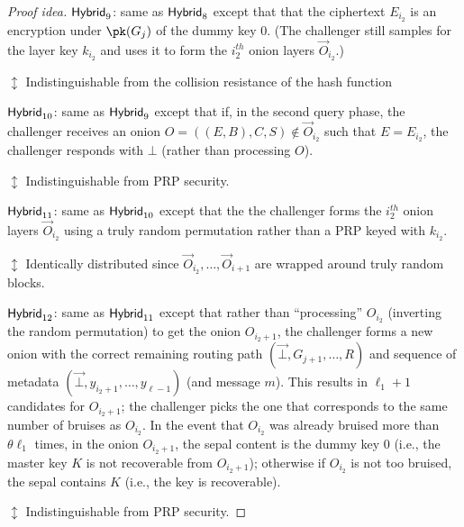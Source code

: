 \documentclass[runningheads,a4paper]{llncs}
\begin{document}
\begin{proof}[Proof idea]
\noindent $\mathsf{Hybrid}_{9}$: same as $\mathsf{Hybrid}_{8}$ except that that the ciphertext $E_{i_2}$ is an encryption under $\pk(G_{j})$ of the dummy key $0$. (The challenger still samples for the layer key $k_{i_2}$ and uses it to form the $i_2^\mathit{th}$ onion layers $\vec{O}_{i_2}$.)

    \textcolor{hybrid}{$\updownarrow$ Indistinguishable from the collision resistance of the hash function}

\noindent $\mathsf{Hybrid}_{10}$: same as $\mathsf{Hybrid}_{9}$ except that if, in the second query phase, the challenger receives an onion $O = ((E, B), C, S) \not\in \vec{O}_{i_2}$ such that $E=E_{i_2}$, the challenger responds with $\bot$ (rather than processing $O$). 

    \textcolor{hybrid}{$\updownarrow$ Indistinguishable from PRP security.}

\noindent $\mathsf{Hybrid}_{11}$: same as $\mathsf{Hybrid}_{10}$ except that the the challenger forms the $i_2^\mathit{th}$ onion layers $\vec{O}_{i_2}$ using a truly random permutation rather than a PRP keyed with $k_{i_2}$.

    \textcolor{hybrid}{$\updownarrow$ Identically distributed since $\vec{O}_{i_2}, \dots, \vec{O}_{i+1}$ are wrapped around truly random blocks.}

\noindent $\mathsf{Hybrid}_{12}$: same as $\mathsf{Hybrid}_{11}$ except that rather than ``processing'' $O_{i_2}$ (inverting the random permutation) to get the onion $O_{i_2+1}$, the challenger forms a new onion with the correct remaining routing path $(\vec{\bot}, G_{j+1}, \dots, R)$ and sequence of metadata $(\vec{\bot}, y_{i_2+1}, \dots, y_{\ell-1})$ (and message $m$). %
This results in $\ell_1+1$ candidates for $O_{i_2+1}$; the challenger picks the one that corresponds to the same number of bruises as $O_{i_2}$.
%
%
In the event that $O_{i_2}$ was already bruised more than $\theta\ell_1$ times, in the onion $O_{i_2+1}$, 
the sepal content is the dummy key $0$ (i.e., the master key $K$ is not recoverable from $O_{i_2+1}$); otherwise if $O_{i_2}$ is not too bruised, the sepal contains $K$ (i.e., the key is recoverable). 

    \textcolor{hybrid}{$\updownarrow$ Indistinguishable from PRP security.}


\end{proof}
\end{document}
